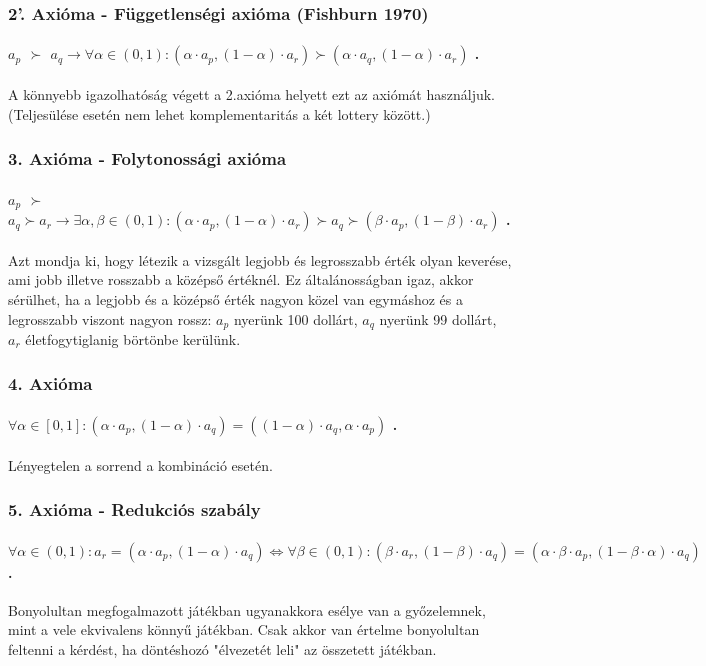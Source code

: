 \documentclass[a4paper,12pt]{article}
\begin{document}
\subsubsection{2'. Axióma - Függetlenségi axióma (Fishburn 1970)}
\paragraph{$a_p$  $\succ$ $a_q \rightarrow \forall \alpha \in (0,1): (\alpha\cdot a_p , (1-\alpha)\cdot a_r ) \succ (\alpha\cdot a_q , (1-\alpha)\cdot a_r )$ .} A könnyebb igazolhatóság végett a 2.axióma helyett ezt az axiómát használjuk. (Teljesülése esetén nem lehet komplementaritás a két lottery között.)

\subsubsection{3. Axióma - Folytonossági axióma}
\paragraph{$a_p$  $\succ$ $a_q \succ a_r \rightarrow \exists \alpha,\beta \in (0,1): (\alpha\cdot a_p , (1-\alpha)\cdot a_r )  \succ a_q \succ (\beta\cdot a_p , (1-\beta)\cdot a_r ) $ .} Azt mondja ki, hogy létezik a vizsgált legjobb és legrosszabb érték olyan keverése, ami jobb illetve rosszabb a középső értéknél. Ez általánosságban igaz, akkor sérülhet, ha a legjobb és a középső érték nagyon közel van egymáshoz és a legrosszabb viszont nagyon rossz: $a_p$ nyerünk 100 dollárt, $a_q$ nyerünk 99 dollárt, $a_r$ életfogytiglanig börtönbe kerülünk.

\subsubsection{4. Axióma}
\paragraph{$\forall  \alpha \in [0,1]: (\alpha\cdot a_p , (1-\alpha)\cdot a_q ) = ((1-\alpha)\cdot a_q ,\alpha\cdot a_p )$ . } Lényegtelen a sorrend a kombináció esetén.

\subsubsection{5. Axióma - Redukciós szabály}
\paragraph{$\forall  \alpha \in (0,1): a_r = (\alpha\cdot a_p , (1-\alpha)\cdot a_q) \Leftrightarrow \forall  \beta \in (0,1): (\beta\cdot a_r, (1-\beta)\cdot a_q ) = (\alpha\cdot \beta\cdot a_p , (1-\beta\cdot \alpha)\cdot a_q )$.} Bonyolultan megfogalmazott játékban ugyanakkora esélye van a győzelemnek, mint a vele ekvivalens könnyű játékban. Csak akkor van értelme bonyolultan feltenni a kérdést, ha döntéshozó "élvezetét leli" az összetett játékban.
\end{document}
